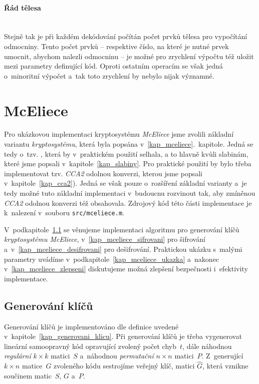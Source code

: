 \documentclass[thesis=M,czech,hidelinks]{FITthesis}[2012/06/26]
\newcommand{\0}{{\textcolor[gray]{0.75}{0}}}
\begin{document}
\paragraph{Řád tělesa} \hfil \\
Stejně tak je při každém dekódování počítán počet prvků tělesa pro vypočítání
odmocniny. Tento počet prvků -- respektive číslo, na které je nutné prvek umocnit,
abychom nalezli odmocninu -- je možné pro zrychlení výpočtu též uložit mezi
parametry definující kód. Oproti ostatním operacím se však jedná o~minoritní
výpočet a~tak toto zrychlení by nebylo nijak významné.

\newpage



\section{McEliece}

Pro ukázkovou implementaci kryptosystému \emph{McEliece} jsme zvolili základní
variantu \emph{kryptosystému}, která byla popsána
v~\ref{kap_mceliece}.~kapitole. Jedná se tedy o~tzv. , která
by v~praktickém použití selhala, a to hlavně kvůli slabinám, které jsme popsali
v~kapitole~\ref{kap_slabiny}. Pro praktické použití by bylo třeba implementovat
tzv. \emph{CCA2} odolnou konverzi, kterou jsme popsali
v~kapitole~\ref{kap_cca2}). Jedná se však pouze o~rozšíření základní varianty
a~je tedy možné tuto základní implementaci v~budoucnu rozvinout tak, aby
zmíněnou \emph{CCA2} odolnou konverzi též obsahovala. Zdrojový kód této části
implementace je k~nalezení v~souboru \texttt{src/mceliece.m}.

V~podkapitole~\ref{kap_mceliece_generovani} se věnujeme implementaci algoritmu
pro generování klíčů \emph{kryptosystému McEliece},
v~\ref{kap_mceliece_sifrovani} pro šifrování a~v~\ref{kap_mceliece_desifrovani}
pro dešifrování. Praktickou ukázku s~malými parametry uvádíme
v~podkapitole~\ref{kap_mceliece_ukazka} a~nakonec v~\ref{kap_mceliece_zlepseni}
diskutujeme možná zlepšení bezpečnosti i~efektivity implementace.

\subsection{Generování klíčů}\label{kap_mceliece_generovani}

Generování klíčů je implementováno dle definice uvedené
v~kapitole~\ref{kap_generovani_klicu}. Při generování klíčů je třeba vygenerovat
lineární samoopravný kód opravující zvolený počet chyb~$t$, dále náhodnou
\emph{regulární} $k \times k$ matici~$S$ a~náhodnou \emph{permutační}
$n \times n$ matici~$P$. Z~generující $k \times n$ matice~$G$ zvoleného kódu
sestrojíme veřejný klíč, matici $\hat{G}$, která vznikne součinem matic~$S$, $G$
a~$P$.
\end{document}
